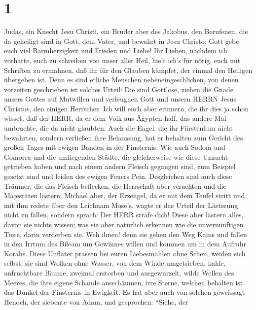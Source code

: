\hypertarget{section}{%
\section{1}\label{section}}

 Judas, ein Knecht Jesu Christi, ein Bruder aber des
Jakobus, den Berufenen, die da geheiligt sind in Gott, dem Vater, und
bewahrt in Jesu Christo:  Gott gebe euch viel Barmherzigkeit
und Frieden und Liebe!  Ihr Lieben, nachdem ich vorhatte,
euch zu schreiben von unser aller Heil, hielt ich's für nötig, euch mit
Schriften zu ermahnen, daß ihr für den Glauben kämpfet, der einmal den
Heiligen übergeben ist.  Denn es sind etliche Menschen
nebeneingeschlichen, von denen vorzeiten geschrieben ist solches Urteil:
Die sind Gottlose, ziehen die Gnade unsers Gottes auf Mutwillen und
verleugnen Gott und unsern HERRN Jesus Christus, den einigen Herrscher.
 Ich will euch aber erinnern, die ihr dies ja schon wisset,
daß der HERR, da er dem Volk aus Ägypten half, das andere Mal umbrachte,
die da nicht glaubten.  Auch die Engel, die ihr Fürstentum
nicht bewahrten, sondern verließen ihre Behausung, hat er behalten zum
Gericht des großen Tages mit ewigen Banden in der Finsternis.
 Wie auch Sodom und Gomorra und die umliegenden Städte, die
gleicherweise wie diese Unzucht getrieben haben und nach einem andern
Fleisch gegangen sind, zum Beispiel gesetzt sind und leiden des ewigen
Feuers Pein.  Desgleichen sind auch diese Träumer, die das
Fleisch beflecken, die Herrschaft aber verachten und die Majestäten
lästern.  Michael aber, der Erzengel, da er mit dem Teufel
stritt und mit ihm redete über den Leichnam Mose's, wagte er das Urteil
der Lästerung nicht zu fällen, sondern sprach: Der HERR strafe dich!
 Diese aber lästern alles, davon sie nichts wissen; was sie
aber natürlich erkennen wie die unvernünftigen Tiere, darin verderben
sie.  Weh ihnen! denn sie gehen den Weg Kains und fallen in
den Irrtum des Bileam um Gewinnes willen und kommen um in dem Aufruhr
Korahs.  Diese Unfläter prassen bei euren Liebesmahlen ohne
Scheu, weiden sich selbst; sie sind Wolken ohne Wasser, von dem Winde
umgetrieben, kahle, unfruchtbare Bäume, zweimal erstorben und
ausgewurzelt,  wilde Wellen des Meeres, die ihre eigene
Schande ausschäumen, irre Sterne, welchen behalten ist das Dunkel der
Finsternis in Ewigkeit.  Es hat aber auch von solchen
geweissagt Henoch, der siebente von Adam, und gesprochen: ``Siehe, der
